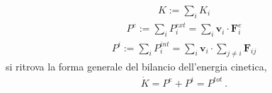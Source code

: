 \documentclass[letterpaper,10pt,english]{jupyterBook}
\begin{document}
\begin{equation*}
\begin{split}K :=  \sum_i K_i\end{split}
\end{equation*}\begin{equation*}
\begin{split}P^e := \sum_i P^{ext}_i = \sum_i \mathbf{v}_i \cdot  \mathbf{F}_i^{e} \end{split}
\end{equation*}\begin{equation*}
\begin{split}P^i := \sum_i P^{int}_i = \sum_i \mathbf{v}_i \cdot \sum_{j \ne i} \mathbf{F}_{ij}\end{split}
\end{equation*}
\sphinxAtStartPar
si ritrova la forma generale del bilancio dell’energia cinetica,
\begin{equation*}
\begin{split}\dot{K} = P^e + P^i = P^{tot} \ .\end{split}
\end{equation*}
\sphinxstepscope
\end{document}
